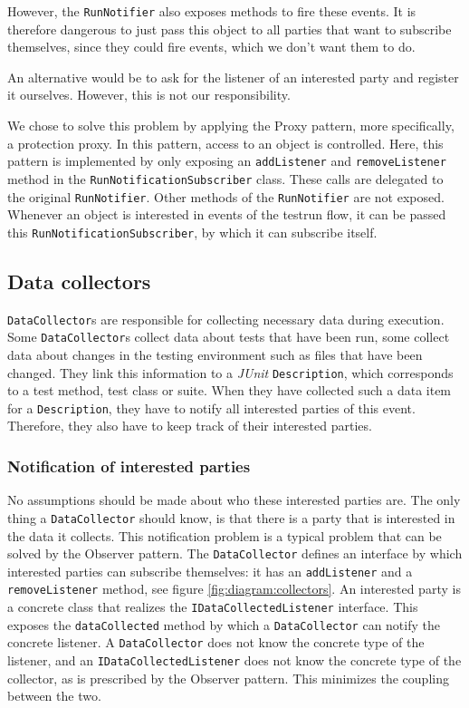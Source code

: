 \documentclass[i2]{oss}
\newcommand{\class}[1]{\texttt{#1}}
\newcommand{\method}[1]{\texttt{#1}}
\newcommand{\junit}{\emph{JUnit }}
\begin{document}
However, the \class{RunNotifier} also exposes methods to fire these events.
It is therefore dangerous to just pass this object to all parties that want to subscribe themselves, since they could fire events, which we don't want them to do.

An alternative would be to ask for the listener of an interested party and register it ourselves.
However, this is not our responsibility.

We chose to solve this problem by applying the Proxy pattern, more specifically, a protection proxy.
In this pattern, access to an object is controlled.
Here, this pattern is implemented by only exposing an \method{addListener} and \method{removeListener} method in the \class{RunNotificationSubscriber} class.
These calls are delegated to the original \class{RunNotifier}.
Other methods of the \class{RunNotifier} are not exposed.
Whenever an object is interested in events of the testrun flow, it can be passed this \class{RunNotificationSubscriber}, by which it can subscribe itself.



\subsection{Data collectors}
\label{subssec:Data collectors}

\class{DataCollector}s are responsible for collecting necessary data 
during execution.
Some \class{DataCollector}s collect data about tests that have been 
run, some collect data about changes in the testing environment such as 
files that have been changed.
They link this information to a \junit \class{Description}, which corresponds to a test method, test class or suite.
When they have collected such a data item for a \class{Description}, they have to notify all interested parties of this event.
Therefore, they also have to keep track of their interested parties.

\subsubsection{Notification of interested parties}
\label{subssec:Notification}

No assumptions should be made about who these interested parties are.
The only thing a \class{DataCollector} should  know, is that there is a party that is interested in the data it collects.
This notification problem is a typical problem that can be solved by the Observer pattern.
The \class{DataCollector} defines an interface by which interested parties can subscribe themselves: it has an \method{addListener} and a \method{removeListener} method, see figure \ref{fig:diagram:collectors}.
An interested party is a concrete class that realizes the \class{IDataCollectedListener} interface. This exposes the \method{dataCollected} method by which a \class{DataCollector} can notify the concrete listener.
A \class{DataCollector} does not know the concrete type of the listener, and an \class{IDataCollectedListener} does not know the concrete type of the collector, as is prescribed by the Observer pattern.
This minimizes the coupling between the two.
\end{document}
